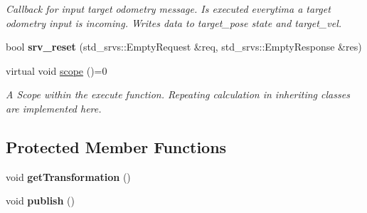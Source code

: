 \begin{DoxyCompactItemize}
\begin{DoxyCompactList}\small\item\em Callback for input target odometry message. Is executed everytima a target odometry input is incoming. Writes data to target\+\_\+pose state and target\+\_\+vel. \end{DoxyCompactList}\item 
bool {\bfseries srv\+\_\+reset} (std\+\_\+srvs\+::\+Empty\+Request \&req, std\+\_\+srvs\+::\+Empty\+Response \&res)\hypertarget{classController_ae24861b9ecd088dc3a58db860fc417b1}{}\label{classController_ae24861b9ecd088dc3a58db860fc417b1}

\item 
virtual void \hyperlink{classController_af89e3d7ed87318418f0168727bd98f0f}{scope} ()=0\hypertarget{classController_af89e3d7ed87318418f0168727bd98f0f}{}\label{classController_af89e3d7ed87318418f0168727bd98f0f}

\begin{DoxyCompactList}\small\item\em A Scope within the execute function. Repeating calculation in inheriting classes are implemented here. \end{DoxyCompactList}\end{DoxyCompactItemize}
\subsection*{Protected Member Functions}
\begin{DoxyCompactItemize}
\item 
void {\bfseries get\+Transformation} ()\hypertarget{classController_a5f86e07f526598b251e345a908923950}{}\label{classController_a5f86e07f526598b251e345a908923950}

\item 
void {\bfseries publish} ()\hypertarget{classController_ae6859e3a43be2fa31cb82ace3954e746}{}\label{classController_ae6859e3a43be2fa31cb82ace3954e746}

\end{DoxyCompactItemize}
